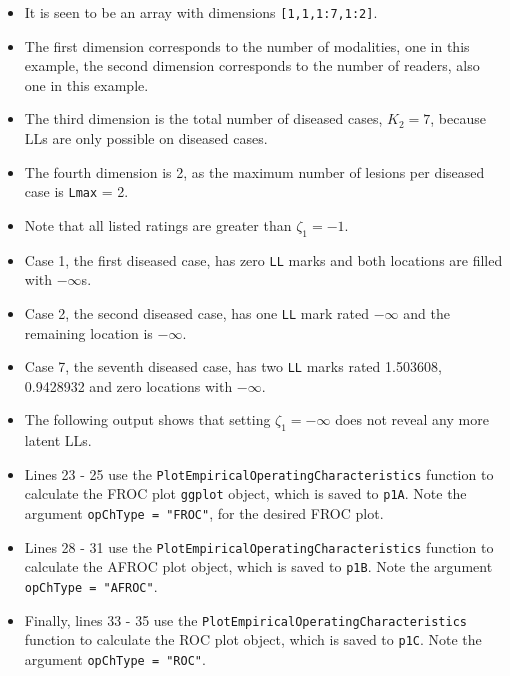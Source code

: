 \documentclass[
]{book}
\newenvironment{Shaded}{\begin{snugshade}}{\end{snugshade}}
\newcommand{\CommentTok}[1]{\textcolor[rgb]{0.56,0.35,0.01}{\textit{#1}}}
\newcommand{\DecValTok}[1]{\textcolor[rgb]{0.00,0.00,0.81}{#1}}
\newcommand{\NormalTok}[1]{#1}
\newcommand{\SpecialCharTok}[1]{\textcolor[rgb]{0.00,0.00,0.00}{#1}}
\begin{document}
\begin{itemize}
\item
  It is seen to be an array with dimensions \texttt{{[}1,1,1:7,1:2{]}}.
\item
  The first dimension corresponds to the number of modalities, one in this example, the second dimension corresponds to the number of readers, also one in this example.
\item
  The third dimension is the total number of diseased cases, \(K_2 = 7\), because LLs are only possible on diseased cases.
\item
  The fourth dimension is 2, as the maximum number of lesions per diseased case is \texttt{Lmax} = 2.
\item
  Note that all listed ratings are greater than \(\zeta_1 = -1\).
\item
  Case 1, the first diseased case, has zero \texttt{LL} marks and both locations are filled with \(-\infty\)s.
\item
  Case 2, the second diseased case, has one \texttt{LL} mark rated \ensuremath{-\infty{}} and the remaining location is \(-\infty\).
\item
  Case 7, the seventh diseased case, has two \texttt{LL} marks rated 1.503608, 0.9428932 and zero locations with \(-\infty\).
\item
  The following output shows that setting \(\zeta_1 = -\infty\) does not reveal any more latent LLs.
\end{itemize}

\begin{Shaded}
\end{Shaded}

\begin{itemize}
\item
  Lines 23 - 25 use the \texttt{PlotEmpiricalOperatingCharacteristics} function to calculate the FROC plot \texttt{ggplot} object, which is saved to \texttt{p1A}. Note the argument \texttt{opChType\ =\ "FROC"}, for the desired FROC plot.
\item
  Lines 28 - 31 use the \texttt{PlotEmpiricalOperatingCharacteristics} function to calculate the AFROC plot object, which is saved to \texttt{p1B}. Note the argument \texttt{opChType\ =\ "AFROC"}.
\item
  Finally, lines 33 - 35 use the \texttt{PlotEmpiricalOperatingCharacteristics} function to calculate the ROC plot object, which is saved to \texttt{p1C}. Note the argument \texttt{opChType\ =\ "ROC"}.
\end{itemize}
\end{document}
